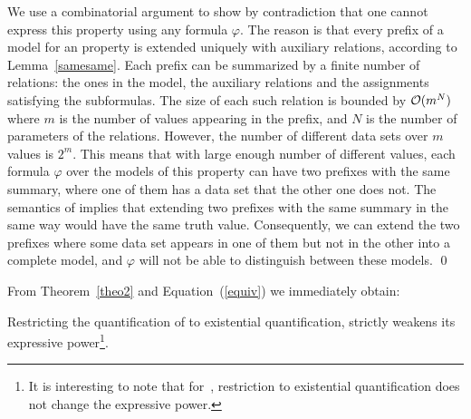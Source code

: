 We use a combinatorial argument to show by contradiction that one cannot express this property using any
\EPFLTL{} formula $\varphi$. The reason is that every prefix of a model for an \EPFLTL{} property is extended uniquely with
auxiliary relations, according to Lemma~\ref{samesame}. Each prefix can be summarized by a finite number of relations: the ones in
the model, the auxiliary relations and the
assignments satisfying the subformulas. The size of
each such relation is bounded by ${\cal O} (  m ^ N )$
where $m$ is the number of values appearing in the
prefix, and $N$ is the number of parameters of the relations.
However, the number of different data sets over $m$ values is
$2^m$. This means that with large enough number of different values, each \EPFLTL{} formula $\varphi$ over the models of this property can have two prefixes with the same summary, where one of them has a data set that the other one does not. The semantics of \EPFLTL{} implies that extending
two prefixes with the same summary in the same way would have the same truth value. Consequently, we can extend
the two prefixes where some data set  appears in one of them
but not  in the other into a complete model, and $\varphi$ will not be able to distinguish between these models. \qed



\vspace{0.7ex} From Theorem~\ref{theo2} and Equation~(\ref{equiv}) we immediately obtain:
\begin{corollary}
Restricting the quantification of \QPFLTL{} to existential quantification, strictly weakens its expressive power\footnote{It is interesting to note that for~\QPLTL{}, restriction to existential quantification does not change the expressive power.}.
\end{corollary}


